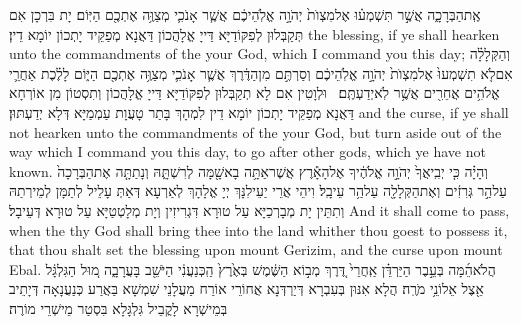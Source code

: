 {אֶֽת\maqqaf הַבְּרָכָ֑ה אֲשֶׁ֣ר תִּשְׁמְע֗וּ אֶל\maqqaf מִצְוֺת֙ יְהֹוָ֣ה אֱלֹֽהֵיכֶ֔ם אֲשֶׁ֧ר אָנֹכִ֛י מְצַוֶּ֥ה אֶתְכֶ֖ם הַיּֽוֹם׃}
{יָת בִּרְכָן אִם תְּקַבְּלוּן לְפִקּוֹדַיָּא דַּייָ אֱלָהֲכוֹן דַּאֲנָא מְפַקֵּיד יָתְכוֹן יוֹמָא דֵין׃}
{the blessing, if ye shall hearken unto the commandments of the \lord\space your God, which I command you this day;}{}
{וְהַקְּלָלָ֗ה אִם\maqqaf לֹ֤א תִשְׁמְעוּ֙ אֶל\maqqaf מִצְוֺת֙ יְהֹוָ֣ה אֱלֹֽהֵיכֶ֔ם וְסַרְתֶּ֣ם מִן\maqqaf הַדֶּ֔רֶךְ אֲשֶׁ֧ר אָנֹכִ֛י מְצַוֶּ֥ה אֶתְכֶ֖ם הַיּ֑וֹם לָלֶ֗כֶת אַחֲרֵ֛י אֱלֹהִ֥ים אֲחֵרִ֖ים אֲשֶׁ֥ר לֹֽא\maqqaf יְדַעְתֶּֽם׃ \setuma }
{וּלְוָטִין אִם לָא תְקַבְּלוּן לְפִקּוֹדַיָּא דַּייָ אֱלָהֲכוֹן וְתִסְטוֹן מִן אוֹרְחָא דַּאֲנָא מְפַקֵּיד יָתְכוֹן יוֹמָא דֵין לִמְהָךְ בָּתַר טָעֲוָת עַמְמַיָּא דְּלָא יְדַעְתּוּן׃}
{and the curse, if ye shall not hearken unto the commandments of the \lord\space your God, but turn aside out of the way which I command you this day, to go after other gods, which ye have not known.}{}
{וְהָיָ֗ה כִּ֤י יְבִֽיאֲךָ֙ יְהֹוָ֣ה אֱלֹהֶ֔יךָ אֶל\maqqaf הָאָ֕רֶץ אֲשֶׁר\maqqaf אַתָּ֥ה בָא\maqqaf שָׁ֖מָּה לְרִשְׁתָּ֑הּ וְנָתַתָּ֤ה אֶת\maqqaf הַבְּרָכָה֙ עַל\maqqaf הַ֣ר גְּרִזִ֔ים וְאֶת\maqqaf הַקְּלָלָ֖ה עַל\maqqaf הַ֥ר עֵיבָֽל׃}
{וִיהֵי אֲרֵי יַעֵילִנָּךְ יְיָ אֱלָהָךְ לְאַרְעָא דְּאַתְּ עָלֵיל לְתַמָּן לְמֵירְתַהּ וְתִתֵּין יָת מְבָרְכַיָּא עַל טוּרָא דִּגְרִיזִין וְיָת מְלָטְטַיָּא עַל טוּרָא דְּעֵיבָל׃}
{And it shall come to pass, when the \lord\space thy God shall bring thee into the land whither thou goest to possess it, that thou shalt set the blessing upon mount Gerizim, and the curse upon mount Ebal.}{}
{הֲלֹא\maqqaf הֵ֜מָּה בְּעֵ֣בֶר הַיַּרְדֵּ֗ן אַֽחֲרֵי֙ דֶּ֚רֶךְ מְב֣וֹא הַשֶּׁ֔מֶשׁ בְּאֶ֙רֶץ֙ הַֽכְּנַעֲנִ֔י הַיֹּשֵׁ֖ב בָּעֲרָבָ֑ה מ֚וּל הַגִּלְגָּ֔ל אֵ֖צֶל אֵלוֹנֵ֥י מֹרֶֽה׃}
{הֲלָא אִנּוּן בְּעִבְרָא דְּיַרְדְּנָא אֲחוֹרֵי אוֹרַח מַעֲלָנֵי שִׁמְשָׁא בַּאֲרַע כְּנַעֲנָאָה דְּיָתֵיב בְּמֵישְׁרָא לָקֳבֵיל גִּלְגָּלָא בִּסְטַר מֵישְׁרֵי מוֹרֶה׃}
